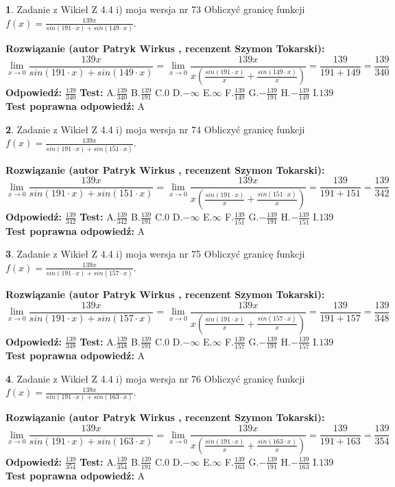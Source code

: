 \documentclass[12pt, a4paper]{article}
\theoremstyle{definition} %
\newtheorem{zad}{}
\newcommand{\zadStart}[1]{\begin{zad}#1\newline}
\newcommand{\zadStop}{\end{zad}}
\newcommand{\rozwStart}[2]{\noindent \textbf{Rozwiązanie (autor #1 , recenzent #2): }\newline}
\newcommand{\rozwStop}{\newline}
\newcommand{\odpStart}{\noindent \textbf{Odpowiedź:}\newline}
\newcommand{\odpStop}{\newline}
\newcommand{\testStart}{\noindent \textbf{Test:}\newline}
\newcommand{\testStop}{\newline}
\newcommand{\kluczStart}{\noindent \textbf{Test poprawna odpowiedź:}\newline}
\newcommand{\kluczStop}{\newline}
\begin{document}
\zadStart{Zadanie z Wikieł Z 4.4 i) moja wersja nr 73}
Obliczyć granicę funkcji $f(x)=\frac{139x}{sin(191\cdot x) +sin(149\cdot x)}$.
\zadStop
\rozwStart{Patryk Wirkus}{Szymon Tokarski}
$$\lim\limits_{x\to 0}\frac{139x}{sin(191\cdot x) +sin(149\cdot x)}=\lim\limits_{x\to 0}\frac{139x}{x(\frac{sin(191\cdot x)}{x}+\frac{sin(149\cdot x)}{x})}=\frac{139}{191+149} = \frac{139}{340}$$
\rozwStop
\odpStart
$\frac{139}{340}$
\odpStop
\testStart
A.$\frac{139}{340}$
B.$\frac{139}{191}$
C.$0$
D.$-\infty$
E.$\infty$
F.$\frac{139}{149}$
G.$-\frac{139}{191}$
H.$-\frac{139}{149}$
I.$139$
\testStop
\kluczStart
A
\kluczStop



\zadStart{Zadanie z Wikieł Z 4.4 i) moja wersja nr 74}
Obliczyć granicę funkcji $f(x)=\frac{139x}{sin(191\cdot x) +sin(151\cdot x)}$.
\zadStop
\rozwStart{Patryk Wirkus}{Szymon Tokarski}
$$\lim\limits_{x\to 0}\frac{139x}{sin(191\cdot x) +sin(151\cdot x)}=\lim\limits_{x\to 0}\frac{139x}{x(\frac{sin(191\cdot x)}{x}+\frac{sin(151\cdot x)}{x})}=\frac{139}{191+151} = \frac{139}{342}$$
\rozwStop
\odpStart
$\frac{139}{342}$
\odpStop
\testStart
A.$\frac{139}{342}$
B.$\frac{139}{191}$
C.$0$
D.$-\infty$
E.$\infty$
F.$\frac{139}{151}$
G.$-\frac{139}{191}$
H.$-\frac{139}{151}$
I.$139$
\testStop
\kluczStart
A
\kluczStop



\zadStart{Zadanie z Wikieł Z 4.4 i) moja wersja nr 75}
Obliczyć granicę funkcji $f(x)=\frac{139x}{sin(191\cdot x) +sin(157\cdot x)}$.
\zadStop
\rozwStart{Patryk Wirkus}{Szymon Tokarski}
$$\lim\limits_{x\to 0}\frac{139x}{sin(191\cdot x) +sin(157\cdot x)}=\lim\limits_{x\to 0}\frac{139x}{x(\frac{sin(191\cdot x)}{x}+\frac{sin(157\cdot x)}{x})}=\frac{139}{191+157} = \frac{139}{348}$$
\rozwStop
\odpStart
$\frac{139}{348}$
\odpStop
\testStart
A.$\frac{139}{348}$
B.$\frac{139}{191}$
C.$0$
D.$-\infty$
E.$\infty$
F.$\frac{139}{157}$
G.$-\frac{139}{191}$
H.$-\frac{139}{157}$
I.$139$
\testStop
\kluczStart
A
\kluczStop



\zadStart{Zadanie z Wikieł Z 4.4 i) moja wersja nr 76}
Obliczyć granicę funkcji $f(x)=\frac{139x}{sin(191\cdot x) +sin(163\cdot x)}$.
\zadStop
\rozwStart{Patryk Wirkus}{Szymon Tokarski}
$$\lim\limits_{x\to 0}\frac{139x}{sin(191\cdot x) +sin(163\cdot x)}=\lim\limits_{x\to 0}\frac{139x}{x(\frac{sin(191\cdot x)}{x}+\frac{sin(163\cdot x)}{x})}=\frac{139}{191+163} = \frac{139}{354}$$
\rozwStop
\odpStart
$\frac{139}{354}$
\odpStop
\testStart
A.$\frac{139}{354}$
B.$\frac{139}{191}$
C.$0$
D.$-\infty$
E.$\infty$
F.$\frac{139}{163}$
G.$-\frac{139}{191}$
H.$-\frac{139}{163}$
I.$139$
\testStop
\kluczStart
A
\kluczStop
\end{document}
